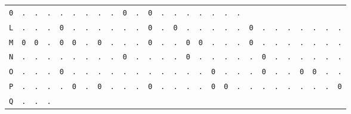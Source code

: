 \begin{figure}[H]
\begin{center}
{\begin{tabular}{c|cccccccccccccccccccccccccc}
				\texttt{0} & \texttt{.} & \texttt{.} & \texttt{.} &
				\texttt{.} & \texttt{.} & \texttt{.} & \texttt{.} &
				\texttt{.} & \texttt{0} & \texttt{.} & \texttt{0} &
				\texttt{.} & \texttt{.} & \texttt{.} & \texttt{.} &
				\texttt{.} & \texttt{.} & \texttt{.}                             \\
				\texttt{L} & \texttt{.} & \texttt{.} & \texttt{.} &
				\texttt{0} & \texttt{.} & \texttt{.} & \texttt{.} &
				\texttt{.} & \texttt{.} & \texttt{.} & \texttt{0} &
				\texttt{.} & \texttt{0} & \texttt{.} & \texttt{.} &
				\texttt{.} & \texttt{.} & \texttt{.} & \texttt{0} &
				\texttt{.} & \texttt{.} & \texttt{.} & \texttt{.} &
				\texttt{.} & \texttt{.} & \texttt{.}                             \\
				\texttt{M} & \texttt{0} & \texttt{0} & \texttt{.} &
				\texttt{0} & \texttt{0} & \texttt{.} & \texttt{0} &
				\texttt{.} & \texttt{.} & \texttt{.} & \texttt{0} &
				\texttt{.} & \texttt{.} & \texttt{0} & \texttt{0} &
				\texttt{.} & \texttt{.} & \texttt{.} & \texttt{0} &
				\texttt{.} & \texttt{.} & \texttt{.} & \texttt{.} &
				\texttt{.} & \texttt{.} & \texttt{.}                             \\
				\texttt{N} & \texttt{.} & \texttt{.} & \texttt{.} &
				\texttt{.} & \texttt{.} & \texttt{.} & \texttt{.} &
				\texttt{.} & \texttt{0} & \texttt{.} & \texttt{.} &
				\texttt{.} & \texttt{.} & \texttt{0} & \texttt{.} &
				\texttt{.} & \texttt{.} & \texttt{.} & \texttt{.} &
				\texttt{0} & \texttt{.} & \texttt{.} & \texttt{.} &
				\texttt{.} & \texttt{.} & \texttt{.}                             \\
				\texttt{O} & \texttt{.} & \texttt{.} & \texttt{.} &
				\texttt{0} & \texttt{.} & \texttt{.} & \texttt{.} &
				\texttt{.} & \texttt{.} & \texttt{.} & \texttt{.} &
				\texttt{.} & \texttt{.} & \texttt{.} & \texttt{.} &
				\texttt{0} & \texttt{.} & \texttt{.} & \texttt{.} &
				\texttt{0} & \texttt{.} & \texttt{.} & \texttt{0} &
				\texttt{0} & \texttt{.} & \texttt{.}                             \\
				\texttt{P} & \texttt{.} & \texttt{.} & \texttt{.} &
				\texttt{.} & \texttt{0} & \texttt{.} & \texttt{0} &
				\texttt{.} & \texttt{.} & \texttt{.} & \texttt{0} &
				\texttt{.} & \texttt{.} & \texttt{.} & \texttt{.} &
				\texttt{0} & \texttt{0} & \texttt{.} & \texttt{.} &
				\texttt{.} & \texttt{.} & \texttt{.} & \texttt{.} &
				\texttt{.} & \texttt{.} & \texttt{0}                             \\
				\texttt{Q} & \texttt{.} & \texttt{.} & \texttt{.} &

\end{tabular}}
\end{center}
\end{figure}
